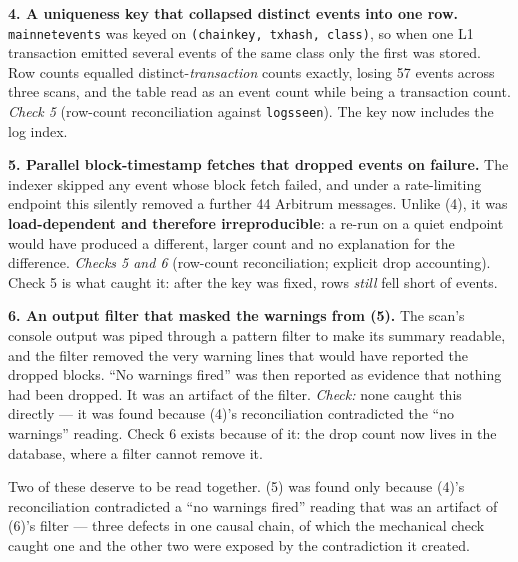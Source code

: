 \documentclass[conference]{IEEEtran}
\renewcommand{\_}{\textunderscore\allowbreak}
\begin{document}
\textbf{4. A uniqueness key that collapsed distinct events into one
row.} \texttt{mainnet\_events} was keyed on
\texttt{(chain\_key,\ tx\_hash,\ class)}, so when one L1 transaction
emitted several events of the same class only the first was stored. Row
counts equalled distinct-\emph{transaction} counts exactly, losing 57
events across three scans, and the table read as an event count while
being a transaction count. \emph{Check 5} (row-count reconciliation
against \texttt{logs\_seen}). The key now includes the log index.

\textbf{5. Parallel block-timestamp fetches that dropped events on
failure.} The indexer skipped any event whose block fetch failed, and
under a rate-limiting endpoint this silently removed a further 44
Arbitrum messages. Unlike (4), it was \textbf{load-dependent and
therefore irreproducible}: a re-run on a quiet endpoint would have
produced a different, larger count and no explanation for the
difference. \emph{Checks 5 and 6} (row-count reconciliation; explicit
drop accounting). Check 5 is what caught it: after the key was fixed,
rows \emph{still} fell short of events.

\textbf{6. An output filter that masked the warnings from (5).} The
scan's console output was piped through a pattern filter to make its
summary readable, and the filter removed the very warning lines that
would have reported the dropped blocks. ``No warnings fired'' was then
reported as evidence that nothing had been dropped. It was an artifact
of the filter. \emph{Check:} none caught this directly --- it was found
because (4)'s reconciliation contradicted the ``no warnings'' reading.
Check 6 exists because of it: the drop count now lives in the database,
where a filter cannot remove it.

Two of these deserve to be read together. (5) was found only because
(4)'s reconciliation contradicted a ``no warnings fired'' reading that
was an artifact of (6)'s filter --- three defects in one causal chain,
of which the mechanical check caught one and the other two were exposed
by the contradiction it created.
\end{document}
